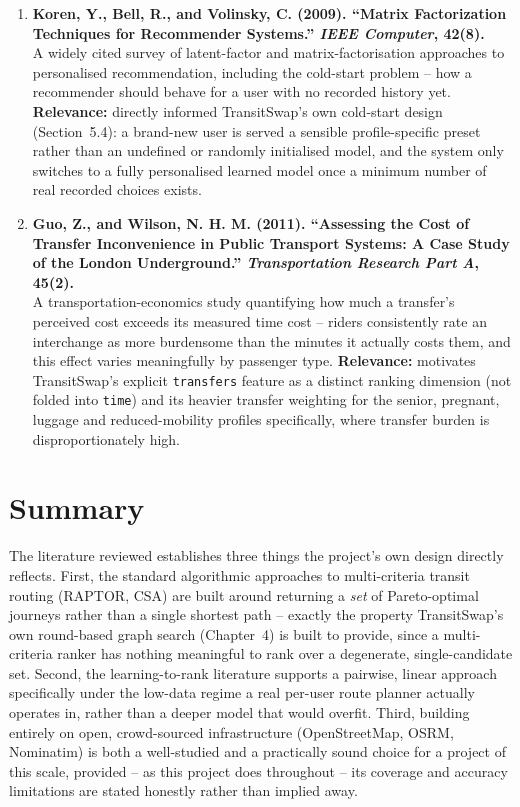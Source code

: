 \documentclass[12pt,a4paper]{report}
\begin{document}
\begin{enumerate}[leftmargin=*]
\item \textbf{Koren, Y., Bell, R., and Volinsky, C. (2009). ``Matrix Factorization Techniques
for Recommender Systems.'' \textit{IEEE Computer}, 42(8).}\\
A widely cited survey of latent-factor and matrix-factorisation approaches to personalised
recommendation, including the cold-start problem -- how a recommender should behave for a user with
no recorded history yet. \textbf{Relevance:} directly informed TransitSwap's own cold-start design
(Section~5.4): a brand-new user is served a sensible profile-specific preset rather than an
undefined or randomly initialised model, and the system only switches to a fully personalised
learned model once a minimum number of real recorded choices exists.

\item \textbf{Guo, Z., and Wilson, N. H. M. (2011). ``Assessing the Cost of Transfer
Inconvenience in Public Transport Systems: A Case Study of the London Underground.''
\textit{Transportation Research Part A}, 45(2).}\\
A transportation-economics study quantifying how much a transfer's perceived cost exceeds its
measured time cost -- riders consistently rate an interchange as more burdensome than the minutes it
actually costs them, and this effect varies meaningfully by passenger type. \textbf{Relevance:}
motivates TransitSwap's explicit \texttt{transfers} feature as a distinct ranking dimension (not
folded into \texttt{time}) and its heavier transfer weighting for the senior, pregnant, luggage and
reduced-mobility profiles specifically, where transfer burden is disproportionately high.

\end{enumerate}

\section{Summary}

The literature reviewed establishes three things the project's own design directly reflects. First,
the standard algorithmic approaches to multi-criteria transit routing (RAPTOR, CSA) are built around
returning a \emph{set} of Pareto-optimal journeys rather than a single shortest path -- exactly the
property TransitSwap's own round-based graph search (Chapter~4) is built to provide, since a
multi-criteria ranker has nothing meaningful to rank over a degenerate, single-candidate set.
Second, the learning-to-rank literature supports a pairwise, linear approach specifically under the
low-data regime a real per-user route planner actually operates in, rather than a deeper model that
would overfit. Third, building entirely on open, crowd-sourced infrastructure (OpenStreetMap, OSRM,
Nominatim) is both a well-studied and a practically sound choice for a project of this scale,
provided -- as this project does throughout -- its coverage and accuracy limitations are stated
honestly rather than implied away.
\end{document}
